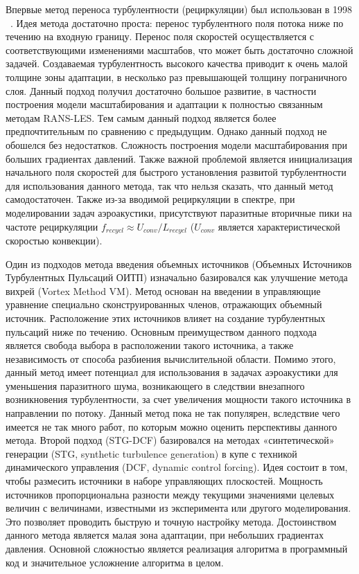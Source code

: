 Впервые метод переноса турбулентности (рециркуляции) был использован в 1998 ~\cite{lund1998generation}. Идея метода достаточно проста: перенос турбулентного поля потока ниже по течению на входную границу. Перенос поля скоростей осуществляется с соответствующими изменениями масштабов, что может быть достаточно сложной задачей. Создаваемая турбулентность высокого качества приводит к очень малой толщине зоны адаптации, в несколько раз превышающей толщину пограничного слоя. Данный подход получил достаточно большое развитие, в частности построения модели масштабирования и адаптации к полностью связанным методам RANS-LES\cite{araya2011dynamic, shur2011rapid, spalart2006direct}. Тем самым данный подход является более предпочтительным по сравнению с предыдущим. Однако данный подход не обошелся без недостатков. Сложность построения модели масштабирования при больших градиентах давлений. Также важной проблемой является инициализация начального поля скоростей для быстрого установления развитой турбулентности для использования данного метода, так что нельзя сказать, что данный метод самодостаточен. Также из-за вводимой рециркуляции в спектре, при моделировании задач аэроакустики, присутствуют паразитные вторичные пики на частоте рециркуляции
$f_{recycl} \approx U_{conv} / L_{recycl}$
($U_{conv}$ является характеристической скоростью конвекции). 

Один из подходов метода введения объемных источников (Объемных Источников Турбулентных Пульсаций ОИТП) изначально базировался как улучшение метода вихрей (Vortex Method VM)\cite{gritskevich2012embedded}. Метод основан на введении в управляющие уравнение специально сконструированных членов, отражающих объемный источник. Расположение этих источников влияет на создание турбулентных пульсаций ниже по течению. Основным преимуществом данного подхода является свобода выбора в расположении такого источника, а также независимость от способа разбиения вычислительной области. Помимо этого, данный метод имеет потенциал для использования в задачах аэроакустики для уменьшения паразитного шума, возникающего в следствии внезапного возникновения турбулентности, за счет увеличения мощности такого источника в направлении по потоку. Данный метод пока не так популярен, вследствие чего имеется не так много работ, по которым можно оценить перспективы данного метода. Второй подход (STG-DCF) базировался на методах «синтетической» генерации (STG, synthetic turbulence generation) в купе с техникой динамического управления (DCF, dynamic control forcing)\cite{spille2001generation}. Идея состоит в том, чтобы размесить источники в наборе управляющих плоскостей. Мощность источников пропорциональна разности между текущими значениями целевых величин с величинами, известными из эксперимента или другого моделирования. Это позволяет проводить быструю и точную настройку метода. Достоинством данного метода является малая зона адаптации, при небольших градиентах давления. Основной сложностью является реализация алгоритма в программный код и значительное усложнение алгоритма в целом. 

